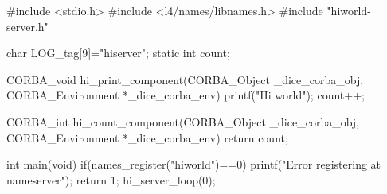 #include <stdio.h>
#include <l4/names/libnames.h>
#include "hiworld-server.h"

char LOG_tag[9]="hiserver";
static int count;

CORBA_void hi_print_component(CORBA_Object _dice_corba_obj,
                              CORBA_Environment *_dice_corba_env){
    printf("Hi world\n");
    count++;
}

CORBA_int hi_count_component(CORBA_Object _dice_corba_obj,
                             CORBA_Environment *_dice_corba_env){
    return count;
}

int main(void){
    if(names_register("hiworld")==0){
      printf("Error registering at nameserver\n");
      return 1;
    }
    hi_server_loop(0);
}
